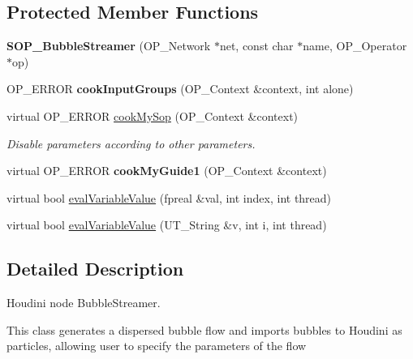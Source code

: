 \subsection*{Protected Member Functions}
\begin{DoxyCompactItemize}
\item 
\hypertarget{class_s_o_p___bubble_streamer_a81f0643870d928546e0e4cfb76dd27c0}{}{\bfseries S\+O\+P\+\_\+\+Bubble\+Streamer} (O\+P\+\_\+\+Network $\ast$net, const char $\ast$name, O\+P\+\_\+\+Operator $\ast$op)\label{class_s_o_p___bubble_streamer_a81f0643870d928546e0e4cfb76dd27c0}

\item 
\hypertarget{class_s_o_p___bubble_streamer_ab065481deb959e52f6ff28ce479447dc}{}O\+P\+\_\+\+E\+R\+R\+O\+R {\bfseries cook\+Input\+Groups} (O\+P\+\_\+\+Context \&context, int alone)\label{class_s_o_p___bubble_streamer_ab065481deb959e52f6ff28ce479447dc}

\item 
virtual O\+P\+\_\+\+E\+R\+R\+O\+R \hyperlink{class_s_o_p___bubble_streamer_a54fc2a42a26f9fc8ff3ad176a489557a}{cook\+My\+Sop} (O\+P\+\_\+\+Context \&context)
\begin{DoxyCompactList}\small\item\em Disable parameters according to other parameters. \end{DoxyCompactList}\item 
\hypertarget{class_s_o_p___bubble_streamer_a6d8ea032973b1077e81334e193181f13}{}virtual O\+P\+\_\+\+E\+R\+R\+O\+R {\bfseries cook\+My\+Guide1} (O\+P\+\_\+\+Context \&context)\label{class_s_o_p___bubble_streamer_a6d8ea032973b1077e81334e193181f13}

\item 
virtual bool \hyperlink{class_s_o_p___bubble_streamer_a1f67f88545d751c50a581b06cc66605e}{eval\+Variable\+Value} (fpreal \&val, int index, int thread)
\item 
virtual bool \hyperlink{class_s_o_p___bubble_streamer_ab252535c93fb0e1db4cdc2a08dc16228}{eval\+Variable\+Value} (U\+T\+\_\+\+String \&v, int i, int thread)
\end{DoxyCompactItemize}


\subsection{Detailed Description}
Houdini node Bubble\+Streamer. 

This class generates a dispersed bubble flow and imports bubbles to Houdini as particles, allowing user to specify the parameters of the flow 

